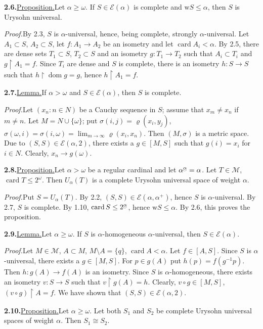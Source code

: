 \documentclass[12pt,a4paper]{article}
\newcommand{\M}{\mathcal{M}}
\newcommand{\E}{\mathcal{E}}
\newcommand{\card}{\operatorname{card}}
\newcommand{\dom}{\operatorname{dom}}
\newcommand{\wt}{\mathrm{w}}
\newcommand{\suprexp}[1]{\underaccent{\smile}{#1}}
\newcommand{\res}{\mathbin{\upharpoonright}}
\newcommand{\itemhead}[2]{\par\noindent\textbf{#1.}\enspace\underline{#2.}\enspace}
\newcommand{\prooftext}{\par\textit{Proof.}\enspace}
\begin{document}
\itemhead{2.6}{Proposition}Let $\alpha\geq\omega$. If $S\in\E(\alpha)$ is complete and $\wt S\leq\alpha$, then $S$ is Urysohn universal.

\prooftext By 2.3, $S$ is $\alpha$-universal, hence, being complete, strongly $\alpha$-universal. Let $A_1\subset S$, $A_2\subset S$, let $f:A_1\longrightarrow A_2$ be an isometry and let $\card A_i<\alpha$. By 2.5, there are dense sets $T_1\subset S$, $T_2\subset S$ and an isometry $g:T_1\longrightarrow T_2$ such that $A_i\subset T_i$ and $g\res A_1=f$. Since $T_i$ are dense and $S$ is complete, there is an isometry $h:S\longrightarrow S$ such that $h\res\dom g=g$, hence $h\res A_1=f$.

\itemhead{2.7}{Lemma}If $\alpha>\omega$ and $S\in\E(\alpha)$, then $S$ is complete.

\prooftext Let $(x_n:n\in N)$ be a Cauchy sequence in $S$; assume that $x_m\ne x_n$ if $m\ne n$. Let $M=N\cup\{\omega\}$; put $\sigma(i,j)=\varrho(x_i,y_j)$, $\sigma(\omega,i)=\sigma(i,\omega)=\lim_{m\to\infty}\varrho(x_i,x_n)$. Then $(M,\sigma)$ is a metric space. Due to $(S,S)\in\E(\alpha,2)$, there exists a $g\in[M,S]$ such that $g(i)=x_i$ for $i\in N$. Clearly, $x_n\longrightarrow g(\omega)$.

\itemhead{2.8}{Proposition}Let $\alpha>\omega$ be a regular cardinal and let $\alpha^{\suprexp{\alpha}}=\alpha$. Let $T\in\M$, $\card T\leq2^\omega$. Then $U_\alpha(T)$ is a complete Urysohn universal space of weight $\alpha$.

\prooftext Put $S=U_\alpha(T)$. By 2.2, $(S,S)\in\E(\alpha,\alpha^+)$, hence $S$ is $\alpha$-universal. By 2.7, $S$ is complete. By 1.10, $\card S\leq2^{\suprexp{\alpha}}$, hence $\wt S\leq\alpha$. By 2.6, this proves the proposition.

\newpage %
\itemhead{2.9}{Lemma}Let $\alpha\geq\omega$. If $S$ is $\alpha$-homogeneous $\alpha$-universal, then $S\in\E(\alpha)$.

\prooftext Let $M\in\M$, $A\subset M$, $M\setminus A=\{q\}$, $\card A<\alpha$. Let $f\in[A,S]$. Since $S$ is $\alpha$-universal, there exists a $g\in[M,S]$. For $p\in g(A)$ put $h(p)=f(g^{-1}p)$. Then $h:g(A)\longrightarrow f(A)$ is an isometry. Since $S$ is $\alpha$-homogeneous, there exists an isometry $v:S\longrightarrow S$ such that $v\res g(A)=h$. Clearly, $v\circ g\in[M,S]$, $(v\circ g)\res A=f$. We have shown that $(S,S)\in\E(\alpha,2)$.

\itemhead{2.10}{Proposition}Let $\alpha\geq\omega$. Let both $S_1$ and $S_2$ be complete Urysohn universal spaces of weight $\alpha$. Then $S_1\cong S_2$.
\end{document}
